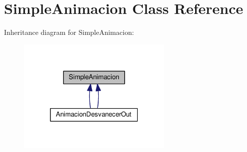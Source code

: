\hypertarget{class_simple_animacion}{}\section{Simple\+Animacion Class Reference}
\label{class_simple_animacion}


Inheritance diagram for Simple\+Animacion\+:
\nopagebreak
\begin{figure}[H]
\begin{center}
\leavevmode
\includegraphics[width=211pt]{class_simple_animacion__inherit__graph}
\end{center}
\end{figure}
